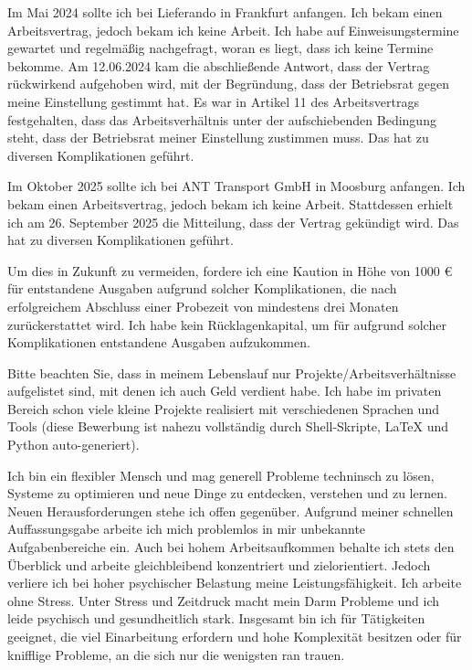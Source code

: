 		Im Mai 2024 sollte ich bei Lieferando in Frankfurt anfangen.
		Ich bekam einen Arbeitsvertrag, jedoch bekam ich keine Arbeit.
		Ich habe auf Einweisungstermine gewartet und regelmäßig nachgefragt, woran es liegt, dass ich keine Termine bekomme.
		Am 12.06.2024 kam die abschließende Antwort, dass der Vertrag rückwirkend aufgehoben wird, mit der Begründung, dass der Betriebsrat gegen meine Einstellung gestimmt hat.
		Es war in Artikel 11 des Arbeitsvertrags festgehalten, dass das Arbeitsverhältnis unter der aufschiebenden Bedingung steht, dass der Betriebsrat meiner Einstellung zustimmen muss.
		Das hat zu diversen Komplikationen geführt.

		Im Oktober 2025 sollte ich bei ANT Transport GmbH in Moosburg anfangen.
		Ich bekam einen Arbeitsvertrag, jedoch bekam ich keine Arbeit.
		Stattdessen erhielt ich am 26. September 2025 die Mitteilung, dass der Vertrag gekündigt wird.
		Das hat zu diversen Komplikationen geführt.

		Um dies in Zukunft zu vermeiden, fordere ich eine Kaution in Höhe von 1000 € für entstandene Ausgaben aufgrund solcher Komplikationen, die nach erfolgreichem Abschluss einer Probezeit von mindestens drei Monaten zurückerstattet wird.
		Ich habe kein Rücklagenkapital, um für aufgrund solcher Komplikationen entstandene Ausgaben aufzukommen.

		Bitte beachten Sie, dass in meinem Lebenslauf nur Projekte/Arbeitsverhältnisse aufgelistet sind, mit denen ich auch Geld verdient habe.
		Ich habe im privaten Bereich schon viele kleine Projekte realisiert mit verschiedenen Sprachen und Tools (diese Bewerbung ist nahezu vollständig durch Shell-Skripte, LaTeX und Python auto-generiert).

		Ich bin ein flexibler Mensch und mag generell Probleme techninsch zu lösen, Systeme zu optimieren und neue Dinge zu entdecken, verstehen und zu lernen.
		Neuen Herausforderungen stehe ich offen gegenüber.
		Aufgrund meiner schnellen Auffassungsgabe arbeite ich mich problemlos in mir unbekannte Aufgabenbereiche ein.
		Auch bei hohem Arbeitsaufkommen behalte ich stets den Überblick und arbeite gleichbleibend konzentriert und zielorientiert.
		Jedoch verliere ich bei hoher psychischer Belastung meine Leistungsfähigkeit.
		Ich arbeite ohne Stress.
		Unter Stress und Zeitdruck macht mein Darm Probleme und ich leide psychisch und gesundheitlich stark.
		Insgesamt bin ich für Tätigkeiten geeignet, die viel Einarbeitung erfordern und hohe Komplexität besitzen oder für knifflige Probleme, an die sich nur die wenigsten ran trauen.

